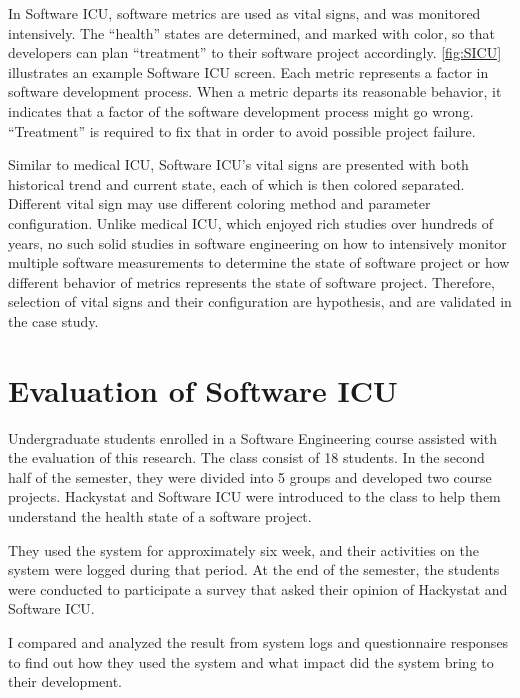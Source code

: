In Software ICU, software metrics are used as vital signs, and was monitored intensively. The ``health'' states are determined, and marked with color, so that developers can plan ``treatment'' to their software project accordingly. \autoref{fig:SICU} illustrates an example Software ICU screen. Each metric represents a factor in software development process. When a metric departs its reasonable behavior, it indicates that a factor of the software development process might go wrong. ``Treatment'' is required to fix that in order to avoid possible project failure.
 
Similar to medical ICU, Software ICU's vital signs are presented with both historical trend and current state, each of which is then colored separated. Different vital sign may use different coloring method and parameter configuration. Unlike medical ICU, which enjoyed rich studies over hundreds of years, no such solid studies in software engineering on how to intensively monitor multiple software measurements to determine the state of software project or how different behavior of metrics represents the state of software project. Therefore, selection of vital signs and their configuration are hypothesis, and are validated in the case study.
 
\section{Evaluation of Software ICU}
Undergraduate students enrolled in a Software Engineering course assisted with the evaluation of this research. The class consist of 18 students. In the second half of the semester, they were divided into 5 groups and developed two course projects. Hackystat and Software ICU were introduced to the class to help them understand the health state of a software project. 

They used the system for approximately six week, and their activities on the system were logged during that period. At the end of the semester, the students were conducted to participate a survey that asked their opinion of Hackystat and Software ICU.

I compared and analyzed the result from system logs and questionnaire responses to find out how they used the system and what impact did the system bring to their development.

